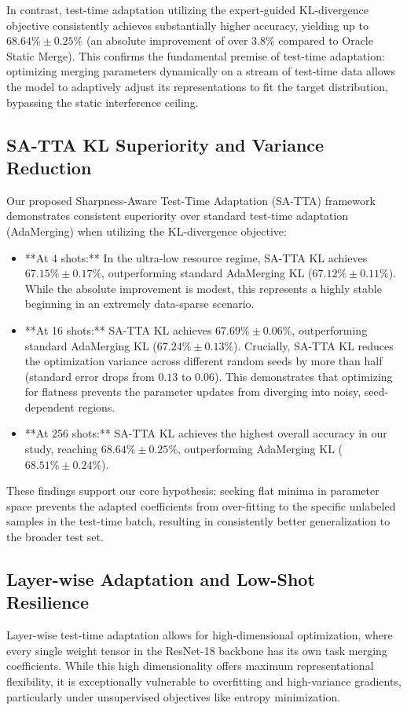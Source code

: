 \documentclass{article}
\theoremstyle{plain}
\theoremstyle{definition}
\theoremstyle{remark}
\begin{document}
In contrast, test-time adaptation utilizing the expert-guided KL-divergence objective consistently achieves substantially higher accuracy, yielding up to $68.64\% \pm 0.25\%$ (an absolute improvement of over $3.8\%$ compared to Oracle Static Merge). This confirms the fundamental premise of test-time adaptation: optimizing merging parameters dynamically on a stream of test-time data allows the model to adaptively adjust its representations to fit the target distribution, bypassing the static interference ceiling.

\subsection{SA-TTA KL Superiority and Variance Reduction}
Our proposed Sharpness-Aware Test-Time Adaptation (SA-TTA) framework demonstrates consistent superiority over standard test-time adaptation (AdaMerging) when utilizing the KL-divergence objective:
\begin{itemize}
    \item **At 4 shots:** In the ultra-low resource regime, SA-TTA KL achieves $67.15\% \pm 0.17\%$, outperforming standard AdaMerging KL ($67.12\% \pm 0.11\%$). While the absolute improvement is modest, this represents a highly stable beginning in an extremely data-sparse scenario.
    \item **At 16 shots:** SA-TTA KL achieves $67.69\% \pm 0.06\%$, outperforming standard AdaMerging KL ($67.24\% \pm 0.13\%$). Crucially, SA-TTA KL reduces the optimization variance across different random seeds by more than half (standard error drops from $0.13$ to $0.06$). This demonstrates that optimizing for flatness prevents the parameter updates from diverging into noisy, seed-dependent regions.
    \item **At 256 shots:** SA-TTA KL achieves the highest overall accuracy in our study, reaching $68.64\% \pm 0.25\%$, outperforming AdaMerging KL ($68.51\% \pm 0.24\%$).
\end{itemize}
These findings support our core hypothesis: seeking flat minima in parameter space prevents the adapted coefficients from over-fitting to the specific unlabeled samples in the test-time batch, resulting in consistently better generalization to the broader test set.

\subsection{Layer-wise Adaptation and Low-Shot Resilience}
Layer-wise test-time adaptation allows for high-dimensional optimization, where every single weight tensor in the ResNet-18 backbone has its own task merging coefficients. While this high dimensionality offers maximum representational flexibility, it is exceptionally vulnerable to overfitting and high-variance gradients, particularly under unsupervised objectives like entropy minimization.
\end{document}
